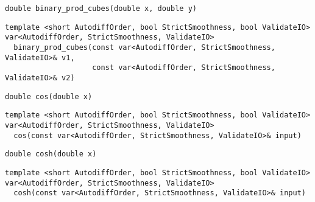 \begin{tcolorbox}[colback=white,colframe=gray90, coltitle=black,boxrule=3pt,
fonttitle=\bfseries,title= Binary Prod Cubes]

\begin{verbatim}
double binary_prod_cubes(double x, double y)

\end{verbatim}

\begin{verbatim}
template <short AutodiffOrder, bool StrictSmoothness, bool ValidateIO>
var<AutodiffOrder, StrictSmoothness, ValidateIO>
  binary_prod_cubes(const var<AutodiffOrder, StrictSmoothness, ValidateIO>& v1,
                    const var<AutodiffOrder, StrictSmoothness, ValidateIO>& v2)

\end{verbatim}

\end{tcolorbox}

\begin{tcolorbox}[colback=white,colframe=gray90, coltitle=black,boxrule=3pt,
fonttitle=\bfseries,title= Cos]

\begin{verbatim}
double cos(double x)

\end{verbatim}

\begin{verbatim}
template <short AutodiffOrder, bool StrictSmoothness, bool ValidateIO>
var<AutodiffOrder, StrictSmoothness, ValidateIO>
  cos(const var<AutodiffOrder, StrictSmoothness, ValidateIO>& input)

\end{verbatim}

\end{tcolorbox}

\begin{tcolorbox}[colback=white,colframe=gray90, coltitle=black,boxrule=3pt,
fonttitle=\bfseries,title= Cosh]

\begin{verbatim}
double cosh(double x)

\end{verbatim}

\begin{verbatim}
template <short AutodiffOrder, bool StrictSmoothness, bool ValidateIO>
var<AutodiffOrder, StrictSmoothness, ValidateIO>
  cosh(const var<AutodiffOrder, StrictSmoothness, ValidateIO>& input)

\end{verbatim}

\end{tcolorbox}

